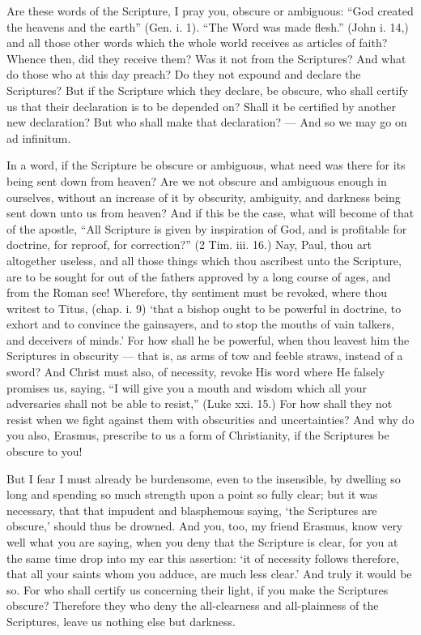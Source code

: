 Are these words of the Scripture, I pray you, obscure or ambiguous: “God created the heavens and the earth” (Gen. i. 1). “The Word was made flesh.” (John i. 14,) and all those other words which the whole world receives as articles of faith? Whence then, did they receive them? Was it not from the Scriptures? And what do those who at this day preach? Do they not expound and declare the Scriptures? But if the Scripture which they declare, be obscure, who shall certify us that their declaration is to be depended on? Shall it be certified by another new declaration? But who shall make that declaration? — And so we may go on ad infinitum.

In a word, if the Scripture be obscure or ambiguous, what need was there for its being sent down from heaven? Are we not obscure and ambiguous enough in ourselves, without an increase of it by obscurity, ambiguity, and darkness being sent down unto us from heaven? And if this be the case, what will become of that of the apostle, “All Scripture is given by inspiration of God, and is profitable for doctrine, for reproof, for correction?” (2 Tim. iii. 16.) Nay, Paul, thou art altogether useless, and all those things which thou ascribest unto the Scripture, are to be sought for out of the fathers approved by a long course of ages, and from the Roman see! Wherefore, thy sentiment must be revoked, where thou writest to Titus, (chap. i. 9) ‘that a bishop ought to be powerful in doctrine, to exhort and to convince the gainsayers, and to stop the mouths of vain talkers, and deceivers of minds.’ For how shall he be powerful, when thou leavest him the Scriptures in obscurity — that is, as arms of tow and feeble straws, instead of a sword? And Christ must also, of necessity, revoke His word where He falsely promises us, saying, “I will give you a mouth and wisdom which all your adversaries shall not be able to resist,” (Luke xxi. 15.) For how shall they not resist when we fight against them with obscurities and uncertainties? And why do you also, Erasmus, prescribe to us a form of Christianity, if the Scriptures be obscure to you!

But I fear I must already be burdensome, even to the insensible, by dwelling so long and spending so much strength upon a point so fully clear; but it was necessary, that that impudent and blasphemous saying, ‘the Scriptures are obscure,’ should thus be drowned. And you, too, my friend Erasmus, know very well what you are saying, when you deny that the Scripture is clear, for you at the same time drop into my ear this assertion: ‘it of necessity follows therefore, that all your saints whom you adduce, are much less clear.’ And truly it would be so. For who shall certify us concerning their light, if you make the Scriptures obscure? Therefore they who deny the all-clearness and all-plainness of the Scriptures, leave us nothing else but darkness.

